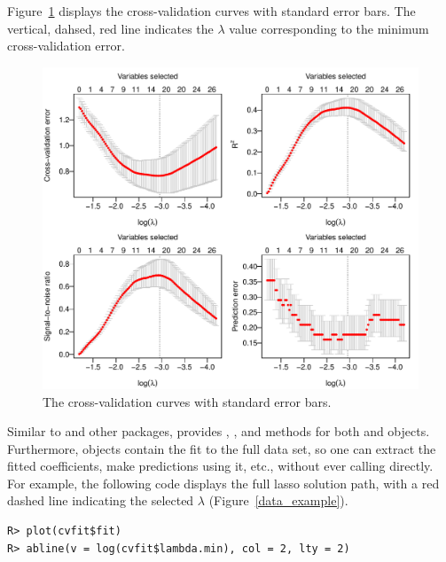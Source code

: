Figure~\ref{data_example_cv} displays the cross-validation curves with standard error bars. The vertical, dahsed, red line indicates the $\lambda$ value corresponding to the minimum cross-validation error.

\begin{figure}[ht]
\centering
\includegraphics[scale=0.4]{Figures/JSS_data_example_cv.pdf}
\caption{The cross-validation curves with standard error bars.}
\label{data_example_cv}
\end{figure}

Similar to  and other packages,  provides , , and  methods for both  and  objects.  Furthermore,  objects contain the  fit to the full data set, so one can extract the fitted coefficients, make predictions using it, etc., without ever calling  directly.  For example, the following code displays the full lasso solution path, with a red dashed line indicating the selected $\lambda$ (Figure~\ref{data_example}).

\begin{verbatim}
R> plot(cvfit$fit)
R> abline(v = log(cvfit$lambda.min), col = 2, lty = 2)
\end{verbatim}

